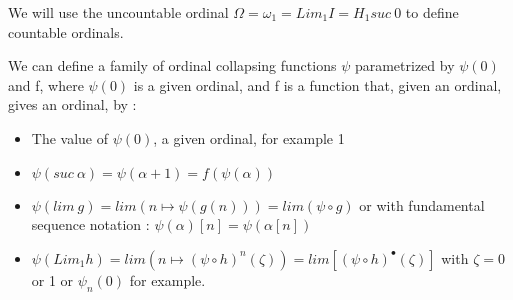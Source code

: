\documentclass[10pt]{article}
\begin{document}
\begin{comment}
\item \( \psi_1(h(\Omega_1)) = lim (n \mapsto (\psi_1 \circ h)^n(\zeta) \) with \( \zeta = 0, 1 \) or \( \psi_1(0) \) for example 

\end{itemize}

With RHS0 notation, \( \Omega_2 \) is written \( H_2 suc\ 0 \) and the fourth rule may be written :

\begin{itemize}
     \setlength{\itemsep}{1pt}
     \setlength{\parskip}{0pt}
     \setlength{\parsep}{0pt}

\item \( \psi (H_2 x y z_1 \ldots z_n) = H [\psi_1([suc \rightarrow x, 0 \rightarrow y] \bullet z_1 \ldots z_n)] 0 \)

\end{itemize}

We can go on like this with \( \psi_2, \Omega_3 = H_3 suc\ 0, \psi_3, \Omega_4 = H_4 suc\ 0, \ldots \).

See also https://www.youtube.com/playlist?list=PLUZ0A4xAf7nkaYHtnqVDbHnrXzVAOxYYC video number 22.

\bigskip



This approach is explained very clearly in https://www.youtube.com/playlist?list=PL3A50BB9C34AB36B3 (Part 29).

\bigskip

\line(1,0){500}

\bigskip

\end{comment}

We will use the uncountable ordinal \( \Omega = \omega_1 = Lim_1 I = H_1 suc\ 0 \) to define countable ordinals.

We can define a family of ordinal collapsing functions \( \psi \) parametrized by \( \psi(0) \) and f, where \( \psi(0) \) is a given ordinal, and f is a function that, given an ordinal, gives an ordinal, by : 

\begin{itemize}
     \setlength{\itemsep}{1pt}
     \setlength{\parskip}{0pt}
     \setlength{\parsep}{0pt}

\item The value of \( \psi(0) \), a given ordinal, for example 1

\item \( \psi(suc\ \alpha) = \psi(\alpha+1) = f(\psi(\alpha)) \) 

\item \( \psi(lim\ g) = lim (n \mapsto \psi(g(n))) = lim(\psi \circ g) \)  
 or with fundamental sequence notation : \( \psi(\alpha)[n] = \psi(\alpha[n]) \)

\item \( \psi(Lim_1 h) = lim (n \mapsto (\psi \circ h)^n(\zeta)) = lim [ (\psi \circ h)^\bullet (\zeta) ] \) with \( \zeta = 0 \) or 1 or \( \psi_n(0) \) for example.

\end{itemize}
\end{document}
